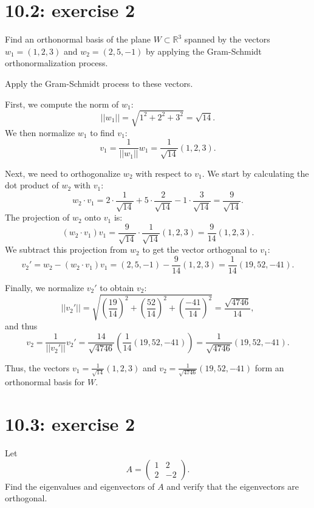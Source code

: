 \documentclass{report}
\begin{document}
\section*{10.2: exercise 2} 
Find an orthonormal basis of the plane \( W \subset \mathbb{R}^3 \) spanned by the vectors \( w_1 = (1, 2, 3) \) and \( w_2 = (2, 5, -1) \) by applying the Gram-Schmidt orthonormalization process.\\

\sol

Apply the Gram-Schmidt process to these vectors.

First, we compute the norm of \( w_1 \):
\[
||w_1|| = \sqrt{1^2 + 2^2 + 3^2} = \sqrt{14}.
\]
We then normalize \( w_1 \) to find \( v_1 \):
\[
v_1 = \frac{1}{||w_1||}w_1 = \frac{1}{\sqrt{14}}(1,2,3).
\]

Next, we need to orthogonalize \( w_2 \) with respect to \( v_1 \). We start by calculating the dot product of \( w_2 \) with \( v_1 \):
\[
w_2 \cdot v_1 = 2 \cdot \frac{1}{\sqrt{14}} + 5 \cdot \frac{2}{\sqrt{14}} - 1 \cdot \frac{3}{\sqrt{14}} = \frac{9}{\sqrt{14}}.
\]
The projection of \( w_2 \) onto \( v_1 \) is:
\[
(w_2 \cdot v_1)v_1 = \frac{9}{\sqrt{14}} \cdot \frac{1}{\sqrt{14}}(1,2,3) = \frac{9}{14}(1,2,3).
\]
We subtract this projection from \( w_2 \) to get the vector orthogonal to \( v_1 \):
\[
v_2' = w_2 - (w_2 \cdot v_1)v_1 = (2,5,-1) - \frac{9}{14}(1,2,3) = \frac{1}{14}(19,52,-41).
\]

Finally, we normalize \( v_2' \) to obtain \( v_2 \):
\[
||v_2'|| = \sqrt{\left(\frac{19}{14}\right)^2 + \left(\frac{52}{14}\right)^2 + \left(\frac{-41}{14}\right)^2} = \frac{\sqrt{4746}}{14},
\]
and thus
\[
v_2 = \frac{1}{||v_2'||}v_2' = \frac{14}{\sqrt{4746}} \left(\frac{1}{14}(19,52,-41)\right) = \frac{1}{\sqrt{4746}}(19,52,-41).
\]

Thus, the vectors \( v_1 = \frac{1}{\sqrt{14}}(1,2,3) \) and \( v_2 = \frac{1}{\sqrt{4746}}(19,52,-41) \) form an orthonormal basis for \( W \).





\section*{10.3: exercise 2} 

Let
\[
A = \begin{pmatrix} 1 & 2 \\ 2 & -2 \end{pmatrix}.
\]
Find the eigenvalues and eigenvectors of \(A\) and verify that the eigenvectors are orthogonal.\\
\end{document}
